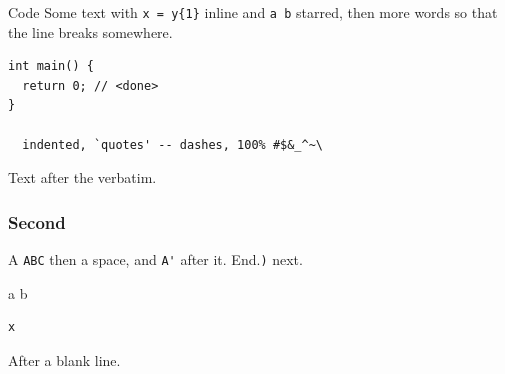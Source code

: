 \documentclass{beamer}
\begin{document}
\begin{frame}[fragile]{Code}
Some text with \verb|x = y{1}| inline and \verb*|a b| starred, then more words so that the line breaks somewhere.
\begin{verbatim}
int main() {
  return 0; // <done>
}

  indented, `quotes' -- dashes, 100% #$&_^~\
\end{verbatim}
Text after the verbatim.
\end{frame}
\begin{frame}[fragile]
\frametitle{Second}
A \verb!ABC! then a space, and \verb+A'+ after it. End.\verb|)| next.
\begin{verbatim*}
a  b
\end{verbatim*}
\begin{verbatim}
x
  \end{verbatim}

After a blank line.
\end{frame}
\end{document}

